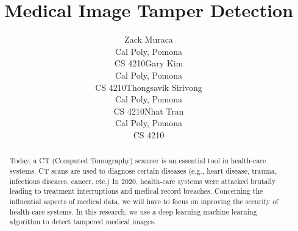 \documentclass[conference]{IEEEtran}
\begin{document}
\title{Medical Image Tamper Detection}
\author{
  \begin{tabular}{ c c c c } %
    \shortstack{Zack Muraca\\
    Cal Poly, Pomona\\ CS 4210}
 &
   \shortstack{Gary Kim\\
    Cal Poly, Pomona\\ CS 4210} %
&
    \shortstack{Thongsavik Sirivong\\
    Cal Poly, Pomona\\ CS 4210}
 &
   \shortstack{Nhat Tran\\
    Cal Poly, Pomona\\ CS 4210}
\end{tabular}
    }
\maketitle


\begin{abstract}
Today, a CT (Computed Tomography) scanner is an essential tool in health-care systems. CT scans are used to diagnose certain diseases (e.g., heart disease, trauma, infectious diseases, cancer, etc.) In 2020, health-care systems were attacked brutally leading to treatment interruptions and medical record breaches. Concerning the influential aspects of medical data, we will have to focus on inproving the security of health-care systems. In this research, we use a deep learning machine learning algorithm to detect tampered medical images.
\end{abstract}
\end{document}
